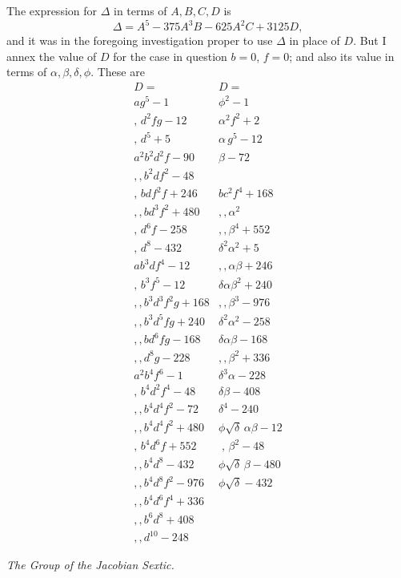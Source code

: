 \documentclass[11pt]{article}
\begin{document}
\newpage
\noindent
The expression for $\Delta$ in terms of $A,B,C,D$ is
\[
  \Delta=A^{5}-375A^{3}B-625A^{2}C+3125D,
\]
and it was in the foregoing investigation proper to use $\Delta$ in
place of $D$.  But I annex the value of $D$ for the case in
question $b=0$, $f=0$; and also its value in terms of
$\alpha,\beta,\delta,\phi$.  These are
\[
\begin{array}{ll}
D= & D=\\[2pt]
ag^{5}-1 & \phi^{2}-1\\
,\,d^{2}fg-12 & \alpha^{2}f^{2}+2\\
,\,d^{5}+5 & \alpha\,g^{5}-12\\
a^{2}b^{2}d^{2}f-90 & \beta-72\\
,,b^{2}df^{2}-48 & \\
,\,bdf^{2}f+246 & bc^{2}f^{4}+168\\
,,bd^{3}f^{2}+480 & ,,\alpha^{2}\\
,\,d^{6}f-258 & ,,\beta^{4}+552\\
,\,d^{8}-432 & \delta^{2}\alpha^{2}+5\\
ab^{3}df^{4}-12 & ,,\alpha\beta+246\\
,\,b^{3}f^{5}-12 & \delta\alpha\beta^{2}+240\\
,,b^{3}d^{3}f^{2}g+168 & ,,\beta^{3}-976\\
,,b^{3}d^{5}fg+240 & \delta^{2}\alpha^{2}-258\\
,,bd^{6}fg-168 & \delta\alpha\beta-168\\
,,d^{8}g-228 & ,,\beta^{2}+336\\
a^{2}b^{4}f^{6}-1 & \delta^{3}\alpha-228\\
,\,b^{4}d^{2}f^{4}-48 & \delta\beta-408\\
,,b^{4}d^{4}f^{2}-72 & \delta^{4}-240\\
,,b^{4}d^{4}f^{2}+480 & \phi\sqrt{\delta}\,\alpha\beta-12\\
,\,b^{4}d^{6}f+552 & \;,\,\beta^{2}-48\\
,,b^{4}d^{8}-432 & \phi\sqrt{\delta}\,\beta-480\\
,,b^{4}d^{8}f^{2}-976 & \phi\sqrt{\delta}-432\\
,,b^{4}d^{6}f^{4}+336 & \\
,,b^{6}d^{8}+408 & \\
,,d^{10}-248 &
\end{array}
\]

\bigskip

\begin{center}
\textit{The Group of the Jacobian Sextic.}
\end{center}
\end{document}
